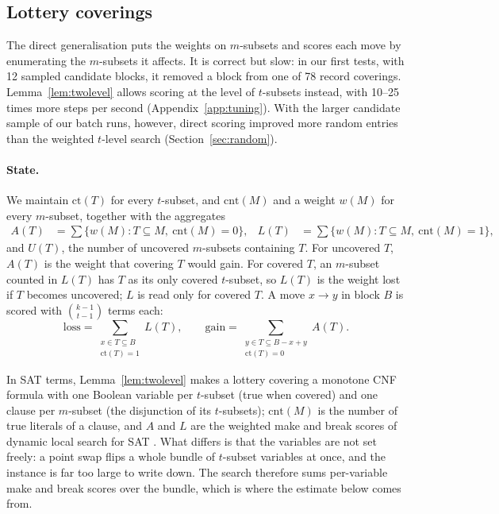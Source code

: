 \documentclass[11pt]{article}
\theoremstyle{remark}
\newcommand{\cov}{\mathrm{ct}}
\newcommand{\cnt}{\mathrm{cnt}}
\begin{document}
\subsection{Lottery coverings}\label{sec:lottery}

The direct generalisation puts the weights on $m$-subsets and scores each move by enumerating the $m$-subsets it
affects. It is correct but slow: in our first tests, with 12 sampled candidate blocks, it removed a block from one of 78
record coverings. Lemma~\ref{lem:twolevel} allows scoring at the level of $t$-subsets instead, with 10--25 times more
steps per second (Appendix~\ref{app:tuning}). With the larger candidate sample of our batch runs, however, direct
scoring improved more random entries than the weighted $t$-level search (Section~\ref{sec:random}).

\paragraph{State.} We maintain $\cov(T)$ for every $t$-subset, and $\cnt(M)$ and a weight $w(M)$ for every
$m$-subset, together with the aggregates
\begin{align*}
A(T) &= \sum\{w(M) : T\subseteq M,\ \cnt(M)=0\}, &
L(T) &= \sum\{w(M) : T\subseteq M,\ \cnt(M)=1\},
\end{align*}
and $U(T)$, the number of uncovered $m$-subsets containing $T$. For uncovered $T$, $A(T)$ is the weight that covering
$T$ would gain. For covered $T$, an $m$-subset counted in $L(T)$ has $T$ as its only covered $t$-subset, so $L(T)$ is
the weight lost if $T$ becomes uncovered; $L$ is read only for covered $T$. A move $x\to y$ in block $B$ is scored with
$\binom{k-1}{t-1}$ terms each:
\[
\mathrm{loss} = \sum_{\substack{x\in T\subseteq B\\ \cov(T)=1}} L(T), \qquad
\mathrm{gain} = \sum_{\substack{y\in T\subseteq B-x+y\\ \cov(T)=0}} A(T).
\]

In SAT terms, Lemma~\ref{lem:twolevel} makes a lottery covering a monotone CNF formula with one Boolean variable per
$t$-subset (true when covered) and one clause per $m$-subset (the disjunction of its $t$-subsets); $\cnt(M)$ is the
number of true literals of a clause, and $A$ and $L$ are the weighted make and break scores of dynamic local search
for SAT \cite{saps2002}. What differs is that the variables are not set freely: a point swap flips a whole bundle of
$t$-subset variables at once, and the instance is far too large to write down. The search therefore sums per-variable
make and break scores over the bundle, which is where the estimate below comes from.
\end{document}
